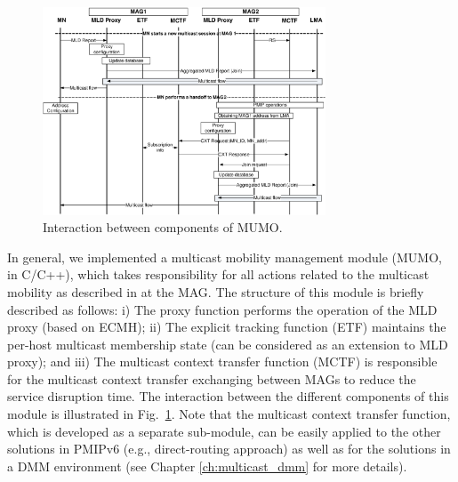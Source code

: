 \begin{figure}[h!] 
 \begin{center} 
 \includegraphics[width=0.750\textwidth]{./Part2/Chapter4/figures/c6_multicast_signaling.eps} 
    \caption[The interactions between components of the multicast mobility management module.]{Interaction between components of MUMO.}
     \label{fig:c6_multicast_signaling}
  \end{center} 
\end{figure}

In general, we implemented a multicast mobility management module (MUMO, in C/C++), which takes responsibility for all actions related to the multicast mobility as described in \cite{d4.2,d4.3} at the MAG. The structure of this module is briefly described as follows: i) The proxy function performs the operation of the MLD proxy (based on ECMH); ii) The explicit tracking function (ETF) maintains the per-host multicast membership state (can be considered as an extension to MLD proxy); and iii) The multicast context transfer function (MCTF) is responsible for the multicast context transfer exchanging between MAGs to reduce the service disruption time. The interaction between the different components of this module is illustrated in Fig.~\ref{fig:c6_multicast_signaling}. Note that the multicast context transfer function, which is developed as a separate sub-module, can be easily applied to the other solutions in PMIPv6 (e.g., direct-routing approach) as well as for the solutions in a DMM environment (see Chapter \ref{ch:multicast_dmm} for more details). 


